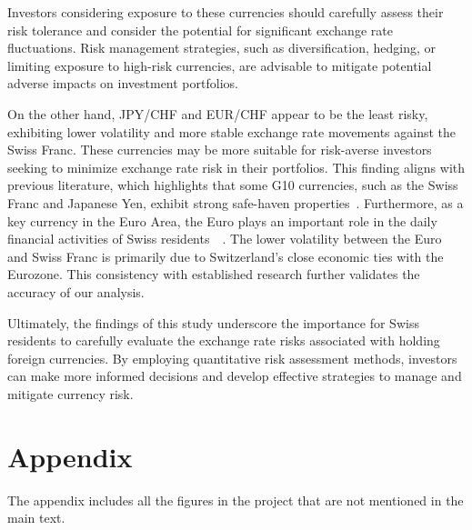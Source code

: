 \documentclass{article}
\begin{document}
Investors considering exposure to these currencies should carefully assess their risk tolerance and consider the potential for significant exchange rate fluctuations. Risk management strategies, such as diversification, hedging, or limiting exposure to high-risk currencies, are advisable to mitigate potential adverse impacts on investment portfolios.

On the other hand, JPY/CHF and EUR/CHF appear to be the least risky, exhibiting lower volatility and more stable exchange rate movements against the Swiss Franc. These currencies may be more suitable for risk-averse investors seeking to minimize exchange rate risk in their portfolios. This finding aligns with previous literature, which highlights that some G10 currencies, such as the Swiss Franc and Japanese Yen, exhibit strong safe-haven properties~\cite{ranaldo2010safe}. Furthermore, as a key currency in the Euro Area, the Euro plays an important role in the daily financial activities of Swiss residents~\cite{engel2016exchange}~\cite{goulferni2023switzerland}. The lower volatility between the Euro and Swiss Franc is primarily due to Switzerland's close economic ties with the Eurozone. This consistency with established research further validates the accuracy of our analysis.

Ultimately, the findings of this study underscore the importance for Swiss residents to carefully evaluate the exchange rate risks associated with holding foreign currencies. By employing quantitative risk assessment methods, investors can make more informed decisions and develop effective strategies to manage and mitigate currency risk.


\section*{Appendix}
The appendix includes all the figures in the project that are not mentioned in the main text.
\end{document}
